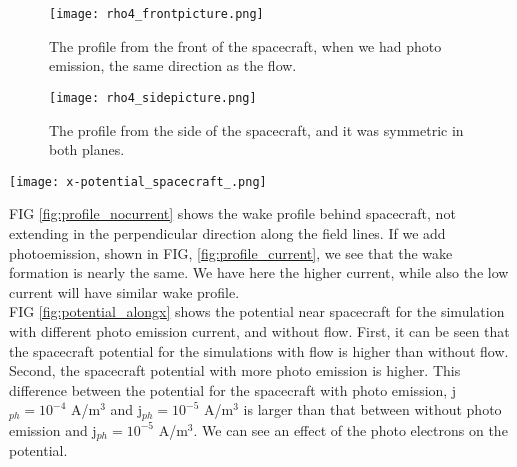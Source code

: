 \documentclass[aip, 
rsi, 
amsmath,
amssymb,
longbibliography,
preprint]{revtex4-1}
\begin{document}
\begin{figure*}
\begin{subfigure}{0.45\textwidth}
\texttt{[image: rho4\_frontpicture.png]}
\caption{The profile from the front of the spacecraft, when we had photo emission, the same direction as the flow.}
\end{subfigure}
\begin{subfigure}{0.45\textwidth}
\texttt{[image: rho4\_sidepicture.png]}
\caption{The profile from the side of the spacecraft, and it was symmetric in both planes.}
\end{subfigure}
\caption{The situation when we have photo-emission, in this case j$_{ph} = 1E-5$ A/m$^3$. The wake in this figure is similar to the one in FIG \ref{fig:profile_nocurrent}. \label{fig:profile_current}}
\end{figure*}

\begin{figure*}
\texttt{[image: x-potential\_spacecraft\_.png]}
\caption{The potential along the flow direction for different photo emissions, emitting direcly to the wake. Top line is the simulation with the photo emission current set to $j_{ph} = 10^{-4}$ A/m$^3$, then  $j_{ph} = 10^{-5}$ A/m$^3$ and without photo emission. We also added the potential for the situation with no plasma flow, seen in the bottom.
\label{fig:potential_alongx}}
\end{figure*}

FIG \ref{fig:profile_nocurrent} shows the wake profile behind spacecraft, not extending in the perpendicular direction along the field lines. If we add photoemission,  shown in FIG, \ref{fig:profile_current}, we see that the wake formation is nearly the same. We have here the higher current, while also the low current will have similar wake profile.\\

FIG \ref{fig:potential_alongx} shows the potential near spacecraft for the simulation with different photo emission current, and without flow. First, it can be seen that the spacecraft potential for the simulations with flow is higher than without flow. Second, the spacecraft potential with more photo emission is higher. This difference between the potential for the spacecraft  with photo emission, j$_{ph} = 10^{-4}$ A/m$^3$ and  j$_{ph} = 10^{-5}$ A/m$^3$ is larger than that between without photo emission and  j$_{ph} = 10^{-5}$ A/m$^3$. We can see an effect of the photo electrons on the potential.\\
\end{document}
